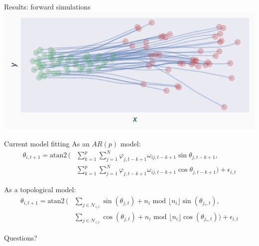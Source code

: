 \documentclass[12pt]{beamer}
\begin{document}
\begin{frame}{Results: forward simulations}
    \vspace{0.85cm}
    \centering
    \includegraphics{forward_sim.pdf}
\end{frame}

\begin{frame}{Current model fitting}
    As an $AR(p)$ model:
    \begin{align*}
        \theta_{i, t+1} = \text{atan2}\,\Bigg(
            &\sum_{k=1}^p \sum_{j=1}^N \varphi_{j, t-k+1} \omega_{ij, t-k+1} \sin \theta_{j, t-k+1},\\
            &\sum_{k=1}^p \sum_{j=1}^N \varphi_{j, t-k+1} \omega_{ij, t-k+1} \cos \theta_{j, t-k+1}
                                        \Bigg) + \epsilon_{i, t}
    \end{align*}

    As a topological model:
    \begin{align*}
        \theta_{i,t+1} = \text{atan2}\,\Bigg(
            &\sum_{j\in\mathcal{N}_{i,t}} \sin(\theta_{j,t})
                + n_i \text{ mod } \lfloor n_i\rfloor \sin(\theta_{j_*, t}),\\
            &\sum_{j\in\mathcal{N}_{i,t}} \cos(\theta_{j,t})
                + n_i \text{ mod } \lfloor n_i\rfloor \cos(\theta_{j_*, t}) \Bigg) + \epsilon_{i, t}
    \end{align*}
\end{frame}

\begin{frame}[standout]
    Questions?
\end{frame}

\appendix
\end{document}
